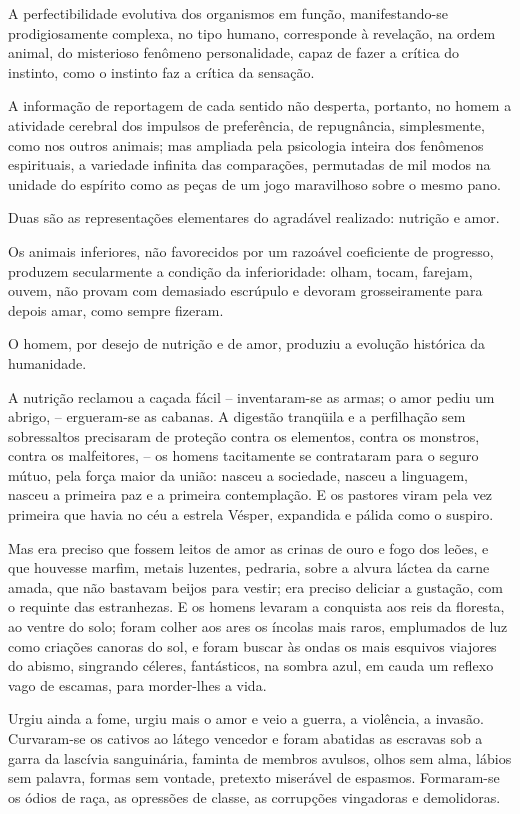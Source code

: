 A perfectibilidade evolutiva dos organismos em função,
manifestando{}-se prodigiosamente complexa, no tipo humano, corresponde
à revelação, na ordem animal, do misterioso fenômeno personalidade,
capaz de fazer a crítica do instinto, como o instinto faz a crítica da
sensação. 

A informação de reportagem de cada sentido não desperta,
portanto, no homem a atividade cerebral dos impulsos de preferência, de
repugnância, simplesmente, como nos outros animais; mas ampliada pela
psicologia inteira dos fenômenos espirituais, a variedade infinita das
comparações, permutadas de mil modos na unidade do espírito como as
peças de um jogo maravilhoso sobre o mesmo pano. 

Duas são as representações elementares do agradável realizado: nutrição e amor. 

Os animais inferiores, não favorecidos por um razoável coeficiente de
progresso, produzem secularmente a condição da inferioridade: olham,
tocam, farejam, ouvem, não provam com demasiado escrúpulo e devoram
grosseiramente para depois amar, como sempre fizeram. 

O homem, por
desejo de nutrição e de amor, produziu a evolução histórica da
humanidade. 

A nutrição reclamou a caçada fácil -- inventaram{}-se as
armas; o amor pediu um abrigo, -- ergueram{}-se as cabanas. A digestão
tranqüila e a perfilhação sem sobressaltos precisaram de proteção
contra os elementos, contra os monstros, contra os malfeitores, -- os
homens tacitamente se contrataram para o seguro mútuo, 
pela força maior da união: nasceu a sociedade, nasceu a
linguagem, nasceu a primeira paz e a primeira contemplação. E os
pastores viram pela vez primeira que havia no céu a estrela Vésper,
expandida e pálida como o suspiro. 

Mas era preciso que fossem leitos de
amor as crinas de ouro e fogo dos leões, e que houvesse marfim, metais
luzentes, pedraria, sobre a alvura láctea da carne amada, que não
bastavam beijos para vestir; era preciso deliciar a gustação, com o
requinte das estranhezas. E os homens levaram a conquista aos reis da
floresta, ao ventre do solo; foram colher aos ares os íncolas mais
raros, emplumados de luz como criações canoras do sol, e foram buscar
às ondas os mais esquivos viajores do abismo, singrando céleres,
fantásticos, na sombra azul, em cauda um reflexo vago de escamas, para
morder{}-lhes a vida. 

Urgiu ainda a fome, urgiu mais o amor e veio a
guerra, a violência, a invasão. Curvaram{}-se os cativos ao látego
vencedor e foram abatidas as escravas sob a garra da lascívia
sanguinária, faminta de membros avulsos, olhos sem alma, lábios sem
palavra, formas sem vontade, pretexto miserável de espasmos.
Formaram{}-se os ódios de raça, as opressões de classe, as corrupções
vingadoras e demolidoras. 


